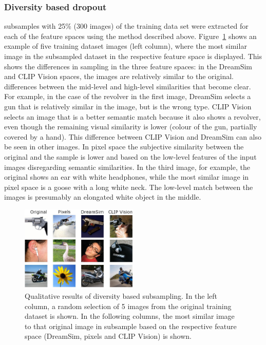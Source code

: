 \subsubsection{Diversity based dropout}
 subsamples with 25\% (300 images) of the training data set were extracted for each of the feature spaces using the method described above. Figure~\ref{fig:dropout_similarity_plot} shows an example of five training dataset images (left column), where the most similar image in the subsampled dataset in the respective feature space is displayed. This shows the differences in sampling in the three feature spaces: in the DreamSim and CLIP Vision spaces, the images are relatively similar to the original.  differences between the mid-level and high-level similarities that become clear. For example, in the case of the revolver in the first image, DreamSim selects a gun that is relatively similar in the image, but is the wrong type. CLIP Vision selects an image that is a better semantic match because it also shows a revolver, even though the remaining visual similarity is lower (colour of the gun, partially covered by a hand). This difference between CLIP Vision and DreamSim can also be seen in other images. In pixel space the subjective similarity between the original and the sample is lower and based on the low-level features of the input images disregarding semantic similarities. In the third image, for example, the original shows an ear with white headphones, while the most similar image in pixel space is a goose with a long white neck. The low-level match between the images is presumably an elongated white object in the middle. 

\begin{figure}[ht]
  \centering
  \includegraphics[width=0.5\textwidth]{plots/dropout_similarity_plot.JPEG}
  \caption[Qualitative results of diversity based subsampling]{Qualitative results of diversity based subsampling. In the left column, a random selection of 5 images from the original training dataset is shown. In the following columns, the most similar image to that original image in subsample based on the respective feature space (DreamSim, pixels and CLIP Vision) is shown.}\label{fig:dropout_similarity_plot}
\end{figure}

